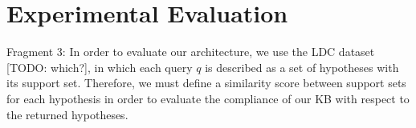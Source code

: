 \section{Experimental Evaluation}

{\color{red} Fragment 3:} In order to evaluate our architecture, we use the LDC dataset {\color{red}[TODO: which?]}, in which each query $q$ is described as a set of hypotheses with its support set. Therefore, {\color{red} we must define a similarity score between support sets for each hypothesis in order to evaluate the compliance of our KB with respect to the returned hypotheses.}